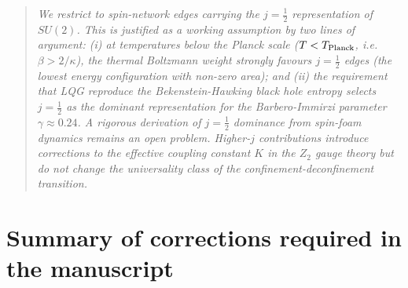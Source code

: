 \documentclass[11pt,a4paper]{article}
\theoremstyle{definition}
\begin{document}
\begin{quote}
  \textit{We restrict to spin-network edges carrying the $j=\tfrac{1}{2}$
  representation of $SU(2)$.  This is justified as a working assumption
  by two lines of argument: (i) at temperatures below the Planck scale
  ($T < T_{\rm Planck}$, i.e.\ $\beta > 2/\kappa$), the thermal Boltzmann
  weight strongly favours $j=\tfrac{1}{2}$ edges (the lowest energy
  configuration with non-zero area); and (ii) the requirement that LQG
  reproduce the Bekenstein-Hawking black hole entropy selects $j=\tfrac{1}{2}$
  as the dominant representation for the Barbero-Immirzi parameter
  $\gamma\approx 0.24$.  A rigorous derivation of $j=\tfrac{1}{2}$
  dominance from spin-foam dynamics remains an open problem.  Higher-$j$
  contributions introduce corrections to the effective coupling constant
  $K$ in the $Z_2$ gauge theory but do not change the universality class
  of the confinement-deconfinement transition.}
\end{quote}

\section{Summary of corrections required in the manuscript}
\label{sec:summary}
\end{document}
